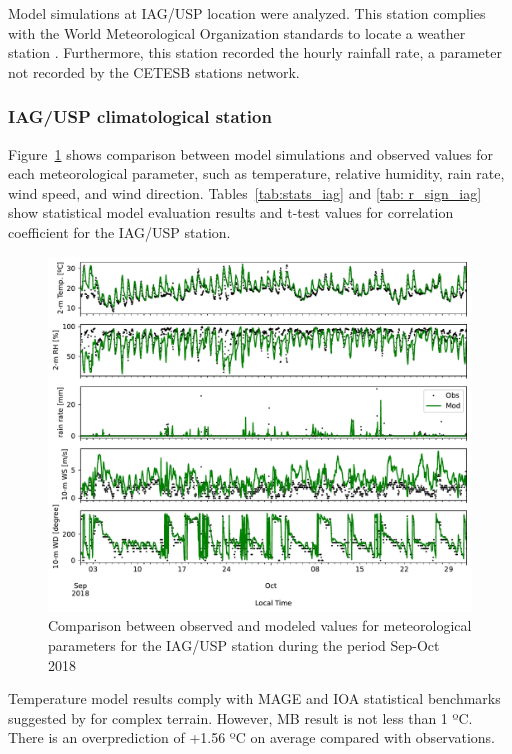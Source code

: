  Model simulations at IAG/USP location were analyzed. 
  This station complies with the World Meteorological Organization standards to locate a weather station \citep{WMO2018}.
  Furthermore, this station recorded the hourly rainfall rate, a parameter not recorded by the CETESB stations network.
  
  \subsubsection{IAG/USP climatological station}
Figure~\ref{fig:met_iag_comp} shows comparison between model simulations and observed values for each meteorological parameter, such as temperature, relative humidity, rain rate, wind speed, and wind direction.
Tables~\ref{tab:stats_iag} and \ref{tab: r_sign_iag} show statistical model evaluation results and t-test values for correlation coefficient for the IAG/USP station.

\begin{figure}[!hbt]
  \includegraphics[width=1\textwidth]{fig/met_IAG_comparison}
  \caption{Comparison between observed and modeled values for meteorological parameters for the IAG/USP station during the period Sep-Oct 2018}
  \label{fig:met_iag_comp}
\end{figure}

Temperature model results comply with MAGE and IOA statistical benchmarks suggested by \citet{Monk2019} for complex terrain.
However, MB result is not less than 1 ºC.
There is an overprediction of +1.56 ºC on average compared with observations.

